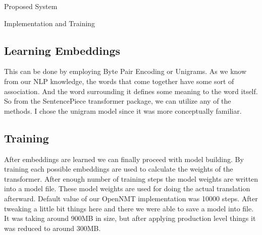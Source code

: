 \begin{chapter}{Proposed System}
\begin{section}{Implementation and Training}
        \subsection{Learning Embeddings}
        This can be done by employing Byte Pair Encoding or Unigrams. As we know from our NLP knowledge, the words that come together have some sort of association. And the word surrounding it defines some meaning to the word itself. So from the SentencePiece transformer package, we can utilize any of the methods. I chose the unigram model since it was more conceptually familiar.

        \subsection{Training}
        After embeddings are learned we can finally proceed with model building. By training each possible embeddings are used to calculate the weights of the transformer. After enough number of training steps the model weights are written into a model file. These model weights are used for doing the actual translation afterward. Default value of our OpenNMT implementation was 10000 steps. After tweaking a little bit things here and there we were able to save a model into file. It was taking around 900MB in size, but after applying production level things it was reduced to around 300MB. 
        
    \end{section}
\end{chapter}